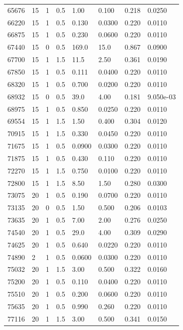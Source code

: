 \documentclass[preview]{standalone}
\begin{document}
{{{{\begin{tabular}{L{1.2cm}C{1.2cm} C{0.3cm}C{0.5cm} C{1.4cm}C{1.4cm} C{1.4cm}C{1.4cm}}
  65676  &    15  & 1     & 0.5 &  1.00  & 0.100  & 0.218 &  0.0250   \\ 
  66220  &    15  & 1     & 0.5 &  0.130  & 0.0300  & 0.220 &  0.0110   \\ 
  66875  &    15  & 1     & 0.5 &  0.230  & 0.0600  & 0.220 &  0.0110   \\ 
  67440  &    15  & 0     & 0.5 &  169.0  & 15.0  & 0.867 &  0.0900   \\ 
  67700  &    15  & 1     & 1.5 &  11.5  & 2.50  & 0.361 &  0.0190   \\ 
  67850  &    15  & 1     & 0.5 &  0.111  & 0.0400  & 0.220 &  0.0110   \\ 
  68320  &    15  & 1     & 0.5 &  0.700  & 0.0200  & 0.220 &  0.0110   \\ 
  68932  &    15  & 0     & 0.5 &  39.0  & 4.00  & 0.181 &  9.050e-03   \\ 
  68975  &    15  & 1     & 0.5 &  0.850  & 0.0250  & 0.220 &  0.0110   \\ 
  69554  &    15  & 1     & 1.5 &  1.50  & 0.400  & 0.304 &  0.0120   \\ 
  70915  &    15  & 1     & 1.5 &  0.330  & 0.0450  & 0.220 &  0.0110   \\ 
  71675  &    15  & 1     & 0.5 &  0.0900  & 0.0300  & 0.220 &  0.0110   \\ 
  71875  &    15  & 1     & 0.5 &  0.430  & 0.110  & 0.220 &  0.0110   \\ 
  72270  &    15  & 1     & 1.5 &  0.750  & 0.0100  & 0.220 &  0.0110   \\ 
  72800  &    15  & 1     & 1.5 &  8.50  & 1.50  & 0.280 &  0.0300   \\ 
  73075  &    20  & 1     & 0.5 &  0.190  & 0.0700  & 0.220 &  0.0110   \\ 
  73135  &    20  & 0     & 0.5 &  1.50  & 0.500  & 0.206 &  0.0103   \\ 
  73635  &    20  & 1     & 0.5 &  7.00  & 2.00  & 0.276 &  0.0250   \\ 
  74540  &    20  & 1     & 0.5 &  29.0  & 4.00  & 0.309 &  0.0290   \\ 
  74625  &    20  & 1     & 0.5 &  0.640  & 0.0220  & 0.220 &  0.0110   \\ 
  74890  &     2  & 1     & 0.5 &  0.0600  & 0.0300  & 0.220 &  0.0110   \\ 
  75032  &    20  & 1     & 1.5 &  3.00  & 0.500  & 0.322 &  0.0160   \\ 
  75200  &    20  & 1     & 0.5 &  0.110  & 0.0400  & 0.220 &  0.0110   \\ 
  75510  &    20  & 1     & 0.5 &  0.200  & 0.0600  & 0.220 &  0.0110   \\ 
  75635  &    20  & 1     & 0.5 &  0.990  & 0.260  & 0.220 &  0.0110   \\ 
  77116  &    20  & 1     & 1.5 &  3.00  & 0.500  & 0.341 &  0.0150   \\ 
\hline 
\end{tabular} 

}}}}
\end{document}
